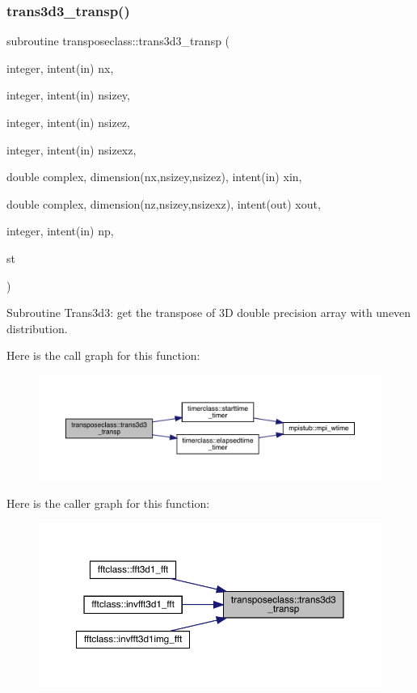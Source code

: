 \subsubsection{\texorpdfstring{trans3d3\_transp()}{trans3d3\_transp()}}
{\footnotesize\ttfamily subroutine transposeclass\+::trans3d3\+\_\+transp (\begin{DoxyParamCaption}\item[{integer, intent(in)}]{nx,  }\item[{integer, intent(in)}]{nsizey,  }\item[{integer, intent(in)}]{nsizez,  }\item[{integer, intent(in)}]{nsizexz,  }\item[{double complex, dimension(nx,nsizey,nsizez), intent(in)}]{xin,  }\item[{double complex, dimension(nz,nsizey,nsizexz), intent(out)}]{xout,  }\item[{integer, intent(in)}]{np,  }\item[{}]{st }\end{DoxyParamCaption})}



Subroutine Trans3d3\+: get the transpose of 3D double precision array with uneven distribution. 

Here is the call graph for this function\+:\nopagebreak
\begin{figure}[H]
\begin{center}
\leavevmode
\includegraphics[width=350pt]{namespacetransposeclass_ac2cdff8d4fbeb19df8a8ba2ff562b8c2_cgraph}
\end{center}
\end{figure}
Here is the caller graph for this function\+:\nopagebreak
\begin{figure}[H]
\begin{center}
\leavevmode
\includegraphics[width=350pt]{namespacetransposeclass_ac2cdff8d4fbeb19df8a8ba2ff562b8c2_icgraph}
\end{center}
\end{figure}
\mbox{\label{namespacetransposeclass_a53eeae5e11acd8c39e03fb8672f2d90e}} 

